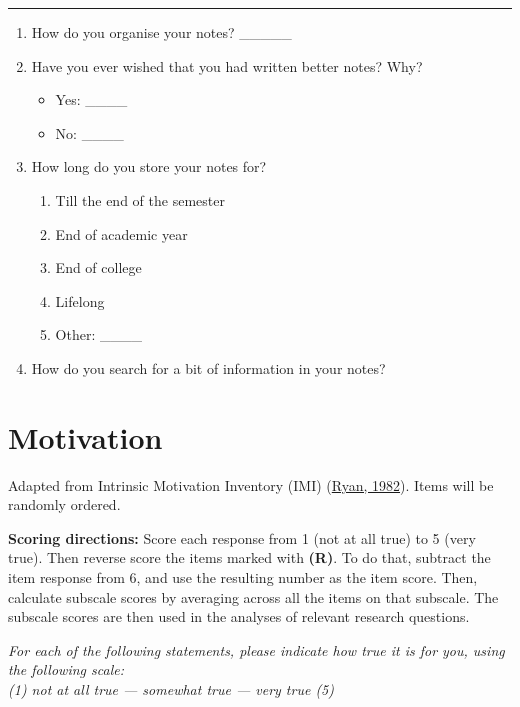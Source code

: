 \documentclass[letterpaper, nobind]{templates/ociamthesis}
\providecommand{\tightlist}{%
  \setlength{\itemsep}{0pt}\setlength{\parskip}{0pt}}
\begin{document}
\begin{center}\rule{0.5\linewidth}{0.5pt}\end{center}

\begin{enumerate}
\def\labelenumi{\arabic{enumi}.}
\setcounter{enumi}{31}
\tightlist
\item
  How do you organise your notes? \_\_\_\_\_
\item
  Have you ever wished that you had written better notes? Why?

  \begin{itemize}
  \tightlist
  \item
    Yes: \_\_\_\_
  \item
    No: \_\_\_\_
  \end{itemize}
\item
  How long do you store your notes for?

  \begin{enumerate}
  \def\labelenumii{\arabic{enumii}.}
  \tightlist
  \item
    Till the end of the semester
  \item
    End of academic year
  \item
    End of college
  \item
    Lifelong
  \item
    Other: \_\_\_\_
  \end{enumerate}
\item
  How do you search for a bit of information in your notes?
\end{enumerate}

\hypertarget{app-imi}{%
\section{Motivation}\label{app-imi}}

Adapted from Intrinsic Motivation Inventory (IMI) (\protect\hyperlink{ref-ryan1982control}{Ryan, 1982}).
Items will be randomly ordered.

\textbf{Scoring directions:}
Score each response from 1 (not at all true) to 5 (very true).
Then reverse score the items marked with \textbf{(R)}.
To do that, subtract the item response from 6, and use the resulting number as the item score.
Then, calculate subscale scores by averaging across all the items on that subscale.
The subscale scores are then used in the analyses of relevant research questions.

\emph{For each of the following statements, please indicate how true it is
for you, using the following scale:}\\
\emph{(1) not at all true --- somewhat true --- very true (5)}
\end{document}
